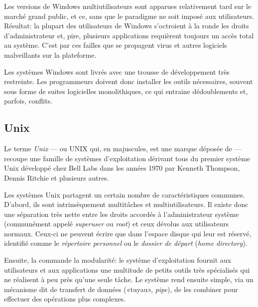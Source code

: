 Les versions de Windows multiutilisateurs sont apparues
relativement tard sur le marché grand public, et ce, sans que le
paradigme ne soit imposé aux utilisateurs. Résultat: la plupart des
utilisateurs de Windows s'octroient à la ronde les droits
d'administrateur et, pire, plusieurs applications requièrent toujours
un accès total au système. C'est par ces failles que se propagent
virus et autres logiciels malveillants sur la plateforme.

Les systèmes Windows sont livrés avec une trousse de
développement très restreinte. Les programmeurs doivent donc installer
les outils nécessaires, souvent sous forme de suites logicielles
monolithiques, ce qui entraine dédoublements et, parfois, conflits.

\subsection{Unix}
\label{sec:informatique:os:unix}

Le terme \emph{Unix} --- ou UNIX qui, en majuscules, est
une marque déposée de 
--- recoupe une famille de systèmes d'exploitation dérivant tous du
premier système Unix développé chez Bell Labs dans les années 1970 par
Kenneth Thompson, Dennis Ritchie et plusieurs autres.

Les systèmes Unix partagent un certain nombre de
caractéristiques communes. D'abord, ils sont intrinsèquement
multitâches et multiutilisateurs. Il existe donc une séparation très
nette entre les droits accordés à l'administrateur système
(communément appelé \emph{superuser} ou \emph{root}) et ceux dévolus
aux utilisateurs normaux. Ceux-ci ne peuvent écrire que dans l'espace
disque qui leur est réservé, identifié comme le %
\emph{répertoire
  personnel} ou le \emph{dossier de départ} (\emph{home directory}).

Ensuite, la
 commande la modularité: le système d'exploitation fournit aux
utilisateurs et aux applications une multitude de petits outils très
spécialisés qui ne réalisent à peu près qu'une seule tâche. Le système
rend ensuite simple, via un mécanisme dit de transfert de données
(«tuyau», \emph{pipe}), de les combiner pour effectuer des opérations
plus complexes.


